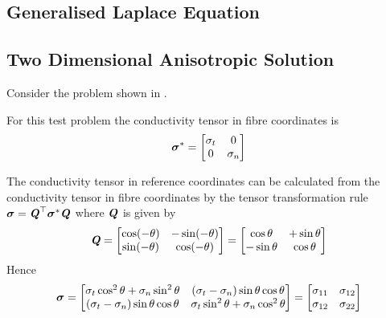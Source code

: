 \subsection{Generalised Laplace Equation} 

\subsection{Two Dimensional Anisotropic Solution}

Consider the problem shown in .


For this test problem the conductivity tensor in fibre coordinates is
\begin{equation}
  \boldsymbol{\mathit{\sigma}}^{*}=\begin{bmatrix}
    \sigma_{t} & 0 \\ 
    0 & \sigma_{n}
  \end{bmatrix}
\end{equation}

The conductivity tensor in  reference coordinates can be calculated from the
conductivity tensor in  fibre coordinates by the tensor transformation rule
$\boldsymbol{\mathit{\sigma}}= {\boldsymbol{\mathit{Q}}}^{ \top } \boldsymbol{\mathit{\sigma}}^{*}\boldsymbol{\mathit{Q}}$ where
$\boldsymbol{\mathit{Q}}$ is given by
\begin{equation}
  \boldsymbol{\mathit{Q}}=\begin{bmatrix}
    \cos(-\theta) & -\sin(-\theta) \\
    \sin(-\theta) & \cos(-\theta)
  \end{bmatrix} = \begin{bmatrix}
    \cos\theta & +\sin\theta \\
    -\sin\theta & \cos\theta
  \end{bmatrix}
\end{equation}
Hence
\begin{equation}
  \tensor{\sigma}=\begin{bmatrix}
    \sigma_{t}\cos^{2}\theta+\sigma_{n}\sin^{2}\theta & 
    \pbrac{\sigma_{t}-\sigma_{n}}\sin\theta\cos\theta \\
    \pbrac{\sigma_{t}-\sigma_{n}}\sin\theta\cos\theta &
    \sigma_{t}\sin^{2}\theta+\sigma_{n}\cos^{2}\theta
  \end{bmatrix} = \begin{bmatrix}
    \sigma_{11} & \sigma_{12} \\
    \sigma_{12} & \sigma_{22} 
  \end{bmatrix}
  \label{eqn:conductivtytransformation}
\end{equation}

